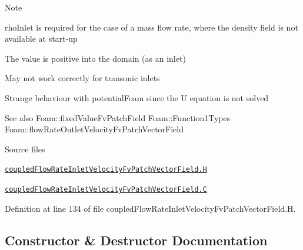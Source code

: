 \begin{DoxyNote}{Note}

\begin{DoxyItemize}
\item {\ttfamily rho\+Inlet} is required for the case of a mass flow rate, where the density field is not available at start-\/up
\item The value is positive into the domain (as an inlet)
\item May not work correctly for transonic inlets
\item Strange behaviour with potential\+Foam since the U equation is not solved
\end{DoxyItemize}
\end{DoxyNote}
\begin{DoxySeeAlso}{See also}
Foam\+::fixed\+Value\+Fv\+Patch\+Field Foam\+::\+Function1\+Types Foam\+::flow\+Rate\+Outlet\+Velocity\+Fv\+Patch\+Vector\+Field
\end{DoxySeeAlso}
\begin{DoxyParagraph}{Source files}

\begin{DoxyItemize}
\item \href{../../../home/carlo/data/GeN-Foam/GeN-Foam_ffn/GeN-Foam/GeN-Foam/FMU4FOAM/ECI4FOAM/src/externalComm/externalIO/input/BC/coupledFlowRateInletVelocity/coupledFlowRateInletVelocityFvPatchVectorField.H}{\tt coupled\+Flow\+Rate\+Inlet\+Velocity\+Fv\+Patch\+Vector\+Field.\+H} 
\item \href{../../../home/carlo/data/GeN-Foam/GeN-Foam_ffn/GeN-Foam/GeN-Foam/FMU4FOAM/ECI4FOAM/src/externalComm/externalIO/input/BC/coupledFlowRateInletVelocity/coupledFlowRateInletVelocityFvPatchVectorField.C}{\tt coupled\+Flow\+Rate\+Inlet\+Velocity\+Fv\+Patch\+Vector\+Field.\+C} 
\end{DoxyItemize}
\end{DoxyParagraph}


Definition at line 134 of file coupled\+Flow\+Rate\+Inlet\+Velocity\+Fv\+Patch\+Vector\+Field.\+H.



\subsection{Constructor \& Destructor Documentation}
\mbox{\label{classFoam_1_1coupledFlowRateInletVelocityFvPatchVectorField_ae373ecfc30e6fc96df4da19c68d40d93}} 
